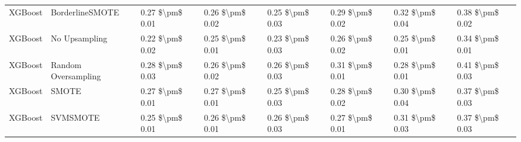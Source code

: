 \begin{tabular}{llllllll}
                        XGBoost &               BorderlineSMOTE &     0.27 \$\textbackslash pm\$ 0.01 &           0.26 \$\textbackslash pm\$ 0.02 &       0.25 \$\textbackslash pm\$ 0.03 &        0.29 \$\textbackslash pm\$ 0.02 &                         0.32 \$\textbackslash pm\$ 0.04 & 0.38 \$\textbackslash pm\$ 0.02 \\
                        XGBoost &                 No Upsampling &     0.22 \$\textbackslash pm\$ 0.02 &           0.25 \$\textbackslash pm\$ 0.01 &       0.23 \$\textbackslash pm\$ 0.03 &        0.26 \$\textbackslash pm\$ 0.02 &                         0.25 \$\textbackslash pm\$ 0.01 & 0.34 \$\textbackslash pm\$ 0.01 \\
                        XGBoost &           Random Oversampling &     0.28 \$\textbackslash pm\$ 0.03 &           0.26 \$\textbackslash pm\$ 0.02 &       0.26 \$\textbackslash pm\$ 0.03 &        0.31 \$\textbackslash pm\$ 0.01 &                         0.28 \$\textbackslash pm\$ 0.01 & 0.41 \$\textbackslash pm\$ 0.03 \\
                        XGBoost &                         SMOTE &     0.27 \$\textbackslash pm\$ 0.01 &           0.27 \$\textbackslash pm\$ 0.01 &       0.25 \$\textbackslash pm\$ 0.03 &        0.28 \$\textbackslash pm\$ 0.02 &                         0.30 \$\textbackslash pm\$ 0.04 & 0.37 \$\textbackslash pm\$ 0.03 \\
                        XGBoost &                      SVMSMOTE &     0.25 \$\textbackslash pm\$ 0.01 &           0.26 \$\textbackslash pm\$ 0.01 &       0.26 \$\textbackslash pm\$ 0.03 &        0.27 \$\textbackslash pm\$ 0.01 &                         0.31 \$\textbackslash pm\$ 0.03 & 0.37 \$\textbackslash pm\$ 0.03 \\
\bottomrule
\end{tabular}
